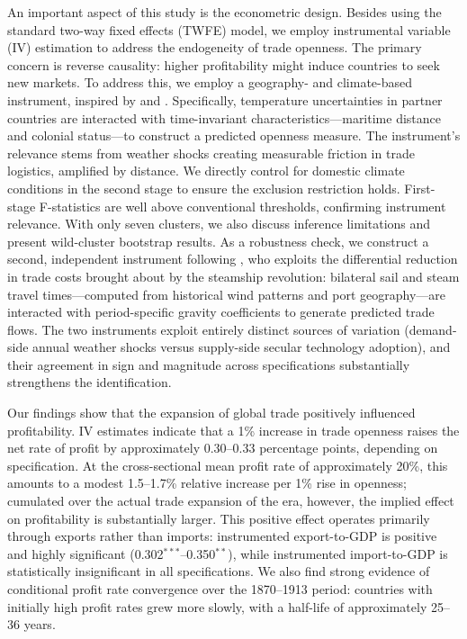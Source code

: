 \documentclass[10pt]{article}
\begin{document}
\par An important aspect of this study is the econometric design. Besides using the standard two-way fixed effects (TWFE) model, we employ instrumental variable (IV) estimation to address the endogeneity of trade openness. The primary concern is reverse causality: higher profitability might induce countries to seek new markets. To address this, we employ a geography- and climate-based instrument, inspired by \citet{felbermayr2013natural} and \citet{frankel2017does}. Specifically, temperature uncertainties in partner countries are interacted with time-invariant characteristics---maritime distance and colonial status---to construct a predicted openness measure. The instrument's relevance stems from weather shocks creating measurable friction in trade logistics, amplified by distance. We directly control for domestic climate conditions in the second stage to ensure the exclusion restriction holds. First-stage F-statistics are well above conventional thresholds, confirming instrument relevance. With only seven clusters, we also discuss inference limitations and present wild-cluster bootstrap results. As a robustness check, we construct a second, independent instrument following \citet{Pascali2017}, who exploits the differential reduction in trade costs brought about by the steamship revolution: bilateral sail and steam travel times---computed from historical wind patterns and port geography---are interacted with period-specific gravity coefficients to generate predicted trade flows. The two instruments exploit entirely distinct sources of variation (demand-side annual weather shocks versus supply-side secular technology adoption), and their agreement in sign and magnitude across specifications substantially strengthens the identification.

\par Our findings show that the expansion of global trade positively influenced profitability. IV estimates indicate that a 1\% increase in trade openness raises the net rate of profit by approximately 0.30--0.33 percentage points, depending on specification. At the cross-sectional mean profit rate of approximately 20\%, this amounts to a modest 1.5--1.7\% relative increase per 1\% rise in openness; cumulated over the actual trade expansion of the era, however, the implied effect on profitability is substantially larger. This positive effect operates primarily through exports rather than imports: instrumented export-to-GDP is positive and highly significant (0.302$^{***}$--0.350$^{**}$), while instrumented import-to-GDP is statistically insignificant in all specifications. We also find strong evidence of conditional profit rate convergence over the 1870--1913 period: countries with initially high profit rates grew more slowly, with a half-life of approximately 25--36 years.
\end{document}

